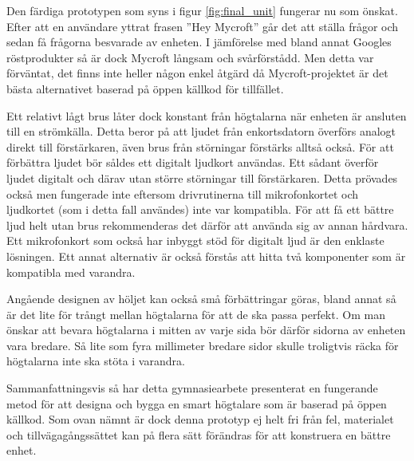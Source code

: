 Den färdiga prototypen som syns i figur \ref{fig:final_unit} fungerar nu som önskat. Efter att en användare yttrat frasen ”Hey Mycroft” går det att ställa frågor och sedan få frågorna besvarade av enheten. I jämförelse med bland annat Googles röstprodukter så är dock Mycroft långsam och svårförstådd. Men detta var förväntat, det finns inte heller någon enkel åtgärd då Mycroft-projektet är det bästa alternativet baserad på öppen källkod för tillfället. 

Ett relativt lågt brus låter dock konstant från högtalarna när enheten är ansluten till en strömkälla. Detta beror på att ljudet från enkortsdatorn överförs analogt direkt till förstärkaren, även brus från störningar förstärks alltså också. För att förbättra ljudet bör såldes ett digitalt ljudkort användas. Ett sådant överför ljudet digitalt och därav utan större störningar till förstärkaren. Detta prövades också men fungerade inte eftersom drivrutinerna till mikrofonkortet och ljudkortet (som i detta fall användes) inte var kompatibla. För att få ett bättre ljud helt utan brus rekommenderas det därför att använda sig av annan hårdvara. Ett mikrofonkort som också har inbyggt stöd för digitalt ljud är den enklaste lösningen. Ett annat alternativ är också förstås att hitta två komponenter som är kompatibla med varandra.

Angående designen av höljet kan också små förbättringar göras, bland annat så är det lite för trångt mellan högtalarna för att de ska passa perfekt. Om man önskar att bevara högtalarna i mitten av varje sida bör därför sidorna av enheten vara bredare. Så lite som fyra millimeter bredare sidor skulle troligtvis räcka för högtalarna inte ska stöta i varandra.

Sammanfattningsvis så har detta gymnasiearbete presenterat en fungerande metod för att designa och bygga en smart högtalare som är baserad på öppen källkod. Som ovan nämnt är dock denna prototyp ej helt fri från fel, materialet och tillvägagångs\-sättet kan på flera sätt förändras för att konstruera en bättre enhet.